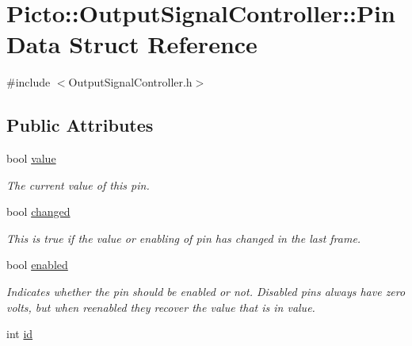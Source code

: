 \hypertarget{struct_picto_1_1_output_signal_controller_1_1_pin_data}{\section{Picto\-:\-:Output\-Signal\-Controller\-:\-:Pin\-Data Struct Reference}
\label{struct_picto_1_1_output_signal_controller_1_1_pin_data}
}


{\ttfamily \#include $<$Output\-Signal\-Controller.\-h$>$}

\subsection*{Public Attributes}
\begin{DoxyCompactItemize}
\item 
\hypertarget{struct_picto_1_1_output_signal_controller_1_1_pin_data_af2874cddb89e8480ea0569cf0f551281}{bool \hyperlink{struct_picto_1_1_output_signal_controller_1_1_pin_data_af2874cddb89e8480ea0569cf0f551281}{value}}\label{struct_picto_1_1_output_signal_controller_1_1_pin_data_af2874cddb89e8480ea0569cf0f551281}

\begin{DoxyCompactList}\small\item\em The current value of this pin. \end{DoxyCompactList}\item 
\hypertarget{struct_picto_1_1_output_signal_controller_1_1_pin_data_a273a553e0e0242900b836e1a1a1b557b}{bool \hyperlink{struct_picto_1_1_output_signal_controller_1_1_pin_data_a273a553e0e0242900b836e1a1a1b557b}{changed}}\label{struct_picto_1_1_output_signal_controller_1_1_pin_data_a273a553e0e0242900b836e1a1a1b557b}

\begin{DoxyCompactList}\small\item\em This is true if the value or enabling of pin has changed in the last frame. \end{DoxyCompactList}\item 
\hypertarget{struct_picto_1_1_output_signal_controller_1_1_pin_data_ac4f1566701318a9d2deef4b0a1eb8d39}{bool \hyperlink{struct_picto_1_1_output_signal_controller_1_1_pin_data_ac4f1566701318a9d2deef4b0a1eb8d39}{enabled}}\label{struct_picto_1_1_output_signal_controller_1_1_pin_data_ac4f1566701318a9d2deef4b0a1eb8d39}

\begin{DoxyCompactList}\small\item\em Indicates whether the pin should be enabled or not. Disabled pins always have zero volts, but when reenabled they recover the value that is in value. \end{DoxyCompactList}\item 
\hypertarget{struct_picto_1_1_output_signal_controller_1_1_pin_data_add302924c08ce4034f5f6e3fceaa594b}{int \hyperlink{struct_picto_1_1_output_signal_controller_1_1_pin_data_add302924c08ce4034f5f6e3fceaa594b}{id}}\label{struct_picto_1_1_output_signal_controller_1_1_pin_data_add302924c08ce4034f5f6e3fceaa594b}


\end{DoxyCompactItemize}

